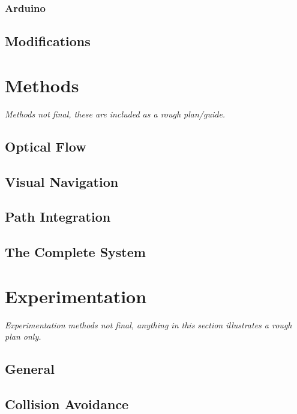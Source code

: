 \documentclass[a4paper,11pt,twoside,openright]{article}
\let\oldsection\section
\def\section{\cleardoublepage\oldsection}
\begin{document}
\subsubsection{ Arduino }
\subsection{ Modifications }
\newpage

\section{ Methods } \label{sec:methods}
\textit{
  Methods not final, these are included as a rough plan/guide.
  }
\subsection{ Optical Flow }
\subsection{ Visual Navigation }
\subsection{ Path Integration }
\subsection{ The Complete System}

\section{Experimentation}\label{sec:test}
\textit{
  Experimentation methods not final, anything in this section illustrates a
  rough plan only.
}
\subsection{General}
\subsection{Collision Avoidance}
\end{document}
